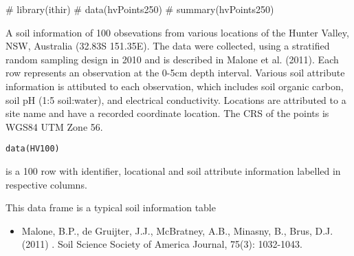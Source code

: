 \documentclass[a4paper]{book}
\begin{document}
%
\begin{Examples}
\begin{ExampleCode}

# library(ithir)
# data(hvPoints250)
# summary(hvPoints250)

\end{ExampleCode}
\end{Examples}
%
\begin{Description}
A soil information  of 100 obsevations from various locations of the Hunter Valley, NSW, Australia (32.83S 151.35E). The data were collected, using a stratified random sampling design in 2010 and is described in Malone et al. (2011). Each row represents an observation at the 0-5cm depth interval. Various soil attribute information is attibuted to each observation, which includes soil organic carbon, soil pH (1:5 soil:water), and electrical conductivity. Locations are attributed to a site name and have a recorded coordinate location. The CRS of the points is WGS84 UTM Zone 56.
\end{Description}
%
\begin{Usage}
\begin{verbatim}
data(HV100)
\end{verbatim}
\end{Usage}
%
\begin{Format}
 is a 100 row  with identifier, locational and soil attribute information labelled in respective columns. 
\end{Format}
%
\begin{Details}
This data frame is a typical soil information table
\end{Details}
%
\begin{References}
\begin{itemize}

\item{} Malone, B.P., de Gruijter, J.J., McBratney, A.B., Minasny, B., Brus, D.J. (2011) . Soil Science Society of America Journal, 75(3): 1032-1043. 

\end{itemize}

\end{References}
\end{document}
